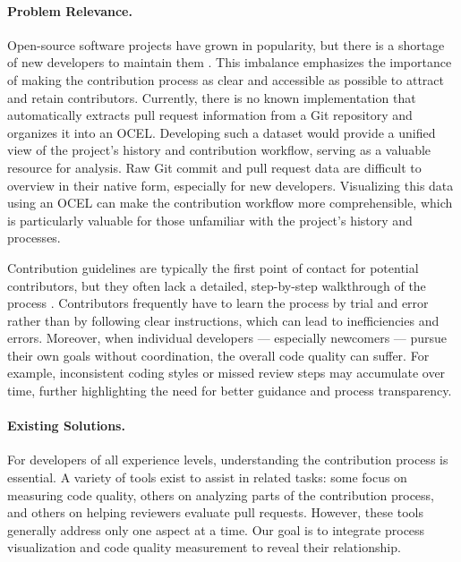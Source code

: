 \paragraph{Problem Relevance.} Open-source software projects have grown in popularity, but there is a shortage of new developers to maintain them \autocite{DBLP:journals/corr/abs-2208-04895}\autocite{DBLP:journals/ese/RehmanWKIM22}. This imbalance emphasizes the importance of making the contribution process as clear and accessible as possible to attract and retain contributors. Currently, there is no known implementation that automatically extracts pull request information from a Git repository and organizes it into an OCEL. Developing such a dataset would provide a unified view of the project’s history and contribution workflow, serving as a valuable resource for analysis. Raw Git commit and pull request data are difficult to overview in their native form, especially for new developers. Visualizing this data using an OCEL can make the contribution workflow more comprehensible, which is particularly valuable for those unfamiliar with the project’s history and processes.

Contribution guidelines are typically the first point of contact for potential contributors, but they often lack a detailed, step-by-step walkthrough of the process \autocite{DBLP:conf/icsm/ElazharySEZ19}. Contributors frequently have to learn the process by trial and error rather than by following clear instructions, which can lead to inefficiencies and errors. Moreover, when individual developers — especially newcomers — pursue their own goals without coordination, the overall code quality can suffer. For example, inconsistent coding styles or missed review steps may accumulate over time, further highlighting the need for better guidance and process transparency.

\paragraph{Existing Solutions.} For developers of all experience levels, understanding the contribution process is essential. A variety of tools exist to assist in related tasks: some focus on measuring code quality, others on analyzing parts of the contribution process, and others on helping reviewers evaluate pull requests. However, these tools generally address only one aspect at a time. Our goal is to integrate process visualization and code quality measurement to reveal their relationship.

